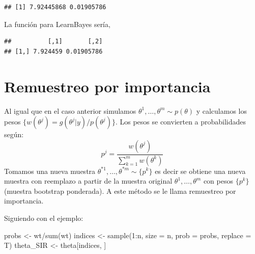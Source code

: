 \documentclass[
  12pt,
]{book}
\newenvironment{Shaded}{\begin{snugshade}}{\end{snugshade}}
\newcommand{\AttributeTok}[1]{\textcolor[rgb]{0.77,0.63,0.00}{#1}}
\newcommand{\ControlFlowTok}[1]{\textcolor[rgb]{0.13,0.29,0.53}{\textbf{#1}}}
\newcommand{\DecValTok}[1]{\textcolor[rgb]{0.00,0.00,0.81}{#1}}
\newcommand{\FunctionTok}[1]{\textcolor[rgb]{0.00,0.00,0.00}{#1}}
\newcommand{\NormalTok}[1]{#1}
\newcommand{\OtherTok}[1]{\textcolor[rgb]{0.56,0.35,0.01}{#1}}
\newcommand{\SpecialCharTok}[1]{\textcolor[rgb]{0.00,0.00,0.00}{#1}}
\theoremstyle{definition}
\theoremstyle{definition}
\theoremstyle{definition}
\theoremstyle{definition}
\theoremstyle{remark}
\begin{document}
\begin{verbatim}
## [1] 7.92445868 0.01905786
\end{verbatim}

La función para LearnBayes sería,

\begin{Shaded}
\end{Shaded}

\begin{verbatim}
##          [,1]       [,2]
## [1,] 7.924459 0.01905786
\end{verbatim}

\hypertarget{remuestreo-por-importancia}{%
\section{Remuestreo por importancia}\label{remuestreo-por-importancia}}

Al igual que en el caso anterior simulamos \(\theta^1,\ldots,\theta^m\sim p(\theta)\) y calculamos los pesos \(\{w(\theta^j)=g(\theta^j|y)/p(\theta^j)\}\). Los pesos se convierten a probabilidades según:
\[p^j=\frac{w(\theta^j)}{\sum_{k=1}^mw(\theta^k)}\]
Tomamos una nueva muestra \(\theta^{*1},\ldots,\theta^{*m}\sim \{p^k\}\) es decir se obtiene una nueva muestra con reemplazo a partir de la muestra original \(\theta^1,\ldots,\theta^m\) con pesos \(\{p^k\}\) (muestra bootstrap ponderada). A este método se le llama remuestreo por importancia.

Siguiendo con el ejemplo:

\begin{Shaded}
\begin{Highlighting}[]
\NormalTok{probs }\OtherTok{\textless{}{-}}\NormalTok{ wt}\SpecialCharTok{/}\FunctionTok{sum}\NormalTok{(wt)}
\NormalTok{indices }\OtherTok{\textless{}{-}} \FunctionTok{sample}\NormalTok{(}\DecValTok{1}\SpecialCharTok{:}\NormalTok{n, }\AttributeTok{size =}\NormalTok{ n, }\AttributeTok{prob =}\NormalTok{ probs, }\AttributeTok{replace =}\NormalTok{ T)}
\NormalTok{theta\_SIR }\OtherTok{\textless{}{-}}\NormalTok{ theta[indices, ]}
\end{Highlighting}
\end{Shaded}
\end{document}
